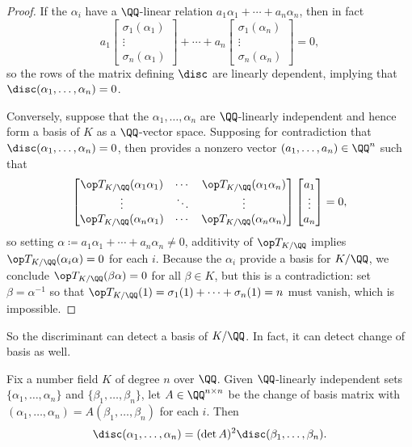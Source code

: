 \documentclass[../notes.tex]{subfiles}
\begin{document}
\begin{proof}
	If the $\alpha_i$ have a $\QQ$-linear relation $a_1\alpha_1+\cdots+a_n\alpha_n$, then in fact
	\[a_1\begin{bmatrix}
		\sigma_1(\alpha_1) \\ \vdots \\ \sigma_n(\alpha_1)
	\end{bmatrix}+\cdots+a_n\begin{bmatrix}
		\sigma_1(\alpha_n) \\ \vdots \\ \sigma_n(\alpha_n)
	\end{bmatrix}=0,\]
	so the rows of the matrix defining $\disc$ are linearly dependent, implying that $\disc(\alpha_1,\ldots,\alpha_n)=0$.

	Conversely, suppose that the $\alpha_1,\ldots,\alpha_n$ are $\QQ$-linearly independent and hence form a basis of $K$ as a $\QQ$-vector space. Supposing for contradiction that $\disc(\alpha_1,\ldots,\alpha_n)=0$, then  provides a nonzero vector $(a_1,\ldots,a_n)\in\QQ^n$ such that
	\[\begin{bmatrix}
		\op T_{K/\QQ}(\alpha_1\alpha_1) & \cdots & \op T_{K/\QQ}(\alpha_1\alpha_n) \\
		\vdots & \ddots & \vdots \\
		\op T_{K/\QQ}(\alpha_n\alpha_1) & \cdots & \op T_{K/\QQ}(\alpha_n\alpha_n)
	\end{bmatrix}\begin{bmatrix}
		a_1 \\ \vdots \\ a_n
	\end{bmatrix}=0,\]
	so setting $\alpha\coloneqq a_1\alpha_1+\cdots+a_n\alpha_n\ne0$, additivity of $\op T_{K/\QQ}$ implies $\op T_{K/\QQ}(\alpha_i\alpha)=0$ for each $i$. Because the $\alpha_i$ provide a basis for $K/\QQ$, we conclude $\op T_{K/\QQ}(\beta\alpha)=0$ for all $\beta\in K$, but this is  a contradiction: set $\beta=\alpha^{-1}$ so that $\op T_{K/\QQ}(1)=\sigma_1(1)+\cdots+\sigma_n(1)=n$ must vanish, which is impossible.
\end{proof}
So the discriminant can detect a basis of $K/\QQ$. In fact, it can detect change of basis as well.
\begin{lemma} \label{lem:disc-change-of-basis}
	Fix a number field $K$ of degree $n$ over $\QQ$. Given $\QQ$-linearly independent sets $\{\alpha_1,\ldots,\alpha_n\}$ and $\{\beta_1,\ldots,\beta_n\}$, let $A\in\QQ^{n\times n}$ be the change of basis matrix with $(\alpha_1,\ldots,\alpha_n)=A(\beta_1,\ldots,\beta_n)$ for each $i$. Then
	\[\disc(\alpha_1,\ldots,\alpha_n)=(\det A)^2\disc(\beta_1,\ldots,\beta_n).\] 
\end{lemma}
\end{document}
